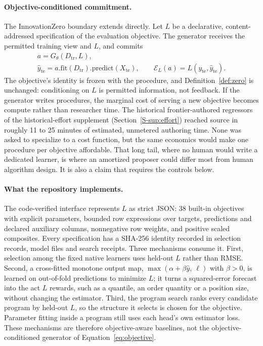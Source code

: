 \paragraph{Objective-conditioned commitment.}
The InnovationZero boundary extends directly. Let $L$ be a declarative,
content-addressed specification of the evaluation objective. The generator
receives the permitted training view and $L$, and commits
\begin{gather}
 a = G_\theta(D_{\mathrm{tr}}, L), \label{eq:objective}\\
 \hat y_{\mathrm{te}} = a.\mathrm{fit}(D_{\mathrm{tr}}).\mathrm{predict}(X_{\mathrm{te}}),
 \qquad \mathcal{E}_L(a) = L(y_{\mathrm{te}}, \hat y_{\mathrm{te}}). \nonumber
\end{gather}
The objective's identity is frozen with the procedure, and
Definition~\ref{def:zero} is unchanged: conditioning on $L$ is permitted
information, not feedback. If the generator writes procedures, the marginal
cost of serving a new objective becomes compute rather than researcher time.
The historical frontier-authored regressors of the historical-effort supplement (Section~\ref{S-sup:effort})
reached source in roughly 11 to 25 minutes of estimated, unmetered authoring
time. None was asked to specialize to a cost function, but the same economics
would make one procedure per objective affordable. That long tail, where no
human would write a dedicated learner, is where an amortized proposer could
differ most from human algorithm design. It is also
a claim that requires the controls below.

\paragraph{What the repository implements.}
The code-verified interface represents $L$ as strict JSON: 38 built-in
objectives with explicit parameters, bounded row expressions over targets,
predictions and declared auxiliary columns, nonnegative row weights, and
positive scaled composites. Every specification has a SHA-256 identity
recorded in selection records, model files and search receipts. Three
mechanisms consume it. First, selection among the fixed native learners uses
held-out $L$ rather than RMSE. Second, a cross-fitted monotone output map,
$\max(\alpha+\beta\hat y,\ \ell)$ with $\beta>0$, is learned on out-of-fold
predictions to minimize $L$; it turns a squared-error forecast into the act
$L$ rewards, such as a quantile, an order quantity or a position size, without
changing the estimator. Third, the program search ranks every candidate program
by held-out $L$, so the structure it selects is chosen for the objective.
Parameter fitting inside a program still uses each head's own estimator loss.
These mechanisms are therefore objective-aware baselines, not the
objective-conditioned generator of Equation~\ref{eq:objective}.

